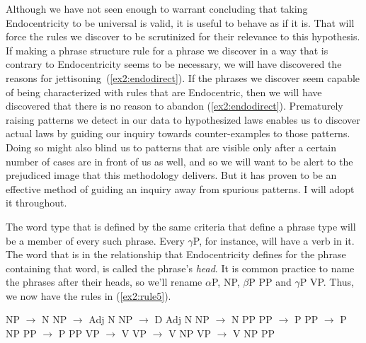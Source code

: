 Although we have not seen enough to warrant concluding that taking Endocentricity to be universal is valid, it is useful to behave as if it is. That will force the rules we discover to be scrutinized for their relevance to this hypothesis. If making a phrase structure rule for a phrase we discover in a way that is contrary to Endocentricity seems to be necessary, we will have discovered the reasons for jettisoning~(\ref{ex2:endodirect}). If the phrases we discover seem capable of being characterized with rules that are Endocentric, then we will have discovered that there is no reason to abandon (\ref{ex2:endodirect}). Prematurely raising patterns we detect in our data to hypothesized laws enables us to discover actual laws by guiding our inquiry towards counter-examples to those patterns. Doing so might also blind us to patterns that are visible only after a certain number of cases are in front of us as well, and so we will want to be alert to the prejudiced image that this methodology delivers. But it has proven to be an effective method of guiding an inquiry away from spurious patterns. I will adopt it throughout.

The word type that is defined by the same criteria that define a phrase type will be a member of every such phrase. Every $\gamma$P, for instance, will have a verb in it. The word that is in the relationship that Endocentricity defines for the phrase containing that word, is called the phrase's \emph{head}. It is common practice to name the phrases after their heads, so we'll rename $\alpha$P, NP, $\beta$P PP and $\gamma$P VP. Thus, we now have the rules in (\ref{ex2:rule5}).
\begin{exe}
	\ex \label{ex2:rule5}
	\begin{xlist} 
		\ex NP $\rightarrow$ N
		\ex NP $\rightarrow$ Adj N 
		\ex NP $\rightarrow$ D Adj N 
		\ex NP $\rightarrow$ N PP
		\ex PP $\rightarrow$ P
	\ex PP $\rightarrow$ P NP
	\ex PP $\rightarrow$ P PP
	\ex VP $\rightarrow$ V 
	\ex VP $\rightarrow$ V NP
	\ex VP $\rightarrow$ V NP PP
	\end{xlist}
\end{exe}

